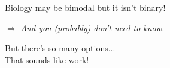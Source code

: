 \documentclass[aspectratio=169,x11names]{beamer}
\begin{document}
\begin{frame}
\begin{center}
\huge
Biology may be bimodal but it isn't binary!\medskip

\Large
$\Rightarrow$ \emph{And you (probably) don't need to know.}
\end{center}
\end{frame}

\begin{frame}
\begin{center}
\huge
But there's so many options...\\
That sounds like work!
\end{center}
\end{frame}
\end{document}
